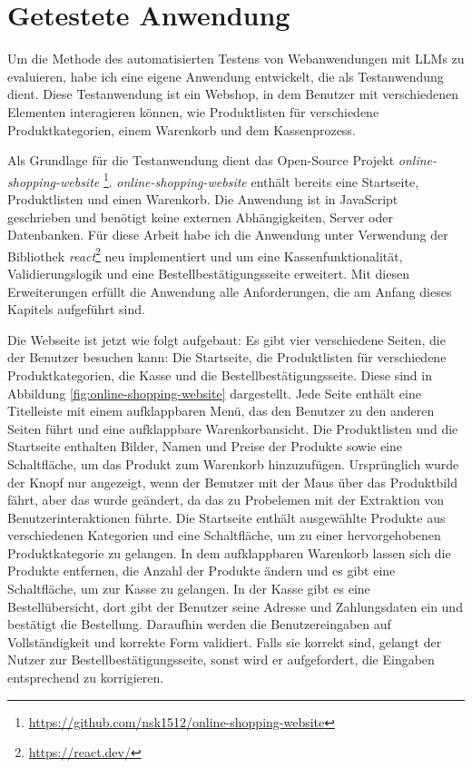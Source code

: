 \section{Getestete Anwendung}

Um die Methode des automatisierten Testens von Webanwendungen mit LLMs zu evaluieren, habe ich eine eigene Anwendung entwickelt, die als Test\-anwendung dient.
Diese Testanwendung ist ein Webshop, in dem Benutzer mit verschiedenen Elementen interagieren können, wie Produktlisten für verschiedene Produktkategorien, einem Warenkorb und dem Kassenprozess.

Als Grundlage für die Testanwendung dient das Open-Source Projekt \textit{online-shopping-website} \footnote{\url{https://github.com/nsk1512/online-shopping-website}}.
\textit{online-shopping-website} enthält bereits eine Startseite, Produktlisten und einen Warenkorb.
Die Anwendung ist in JavaScript geschrieben und benötigt keine externen Abhängigkeiten, Server oder Datenbanken.
Für diese Arbeit habe ich die Anwendung unter Verwendung der Bibliothek \textit{react}\footnote{\url{https://react.dev/}} neu implementiert und um eine Kassenfunktionalität, Validierungslogik und eine Bestellbestätigungsseite erweitert.
Mit diesen Erweiterungen erfüllt die Anwendung alle Anforderungen, die am Anfang dieses Kapitels aufgeführt sind.


Die Webseite ist jetzt wie folgt aufgebaut:
Es gibt vier verschiedene Seiten, die der Benutzer besuchen kann: Die Startseite, die Produktlisten für verschiedene Produktkategorien, die Kasse und die Bestellbestätigungsseite.
Diese sind in Abbildung \ref{fig:online-shopping-website} dargestellt.
Jede Seite enthält eine Titelleiste mit einem aufklappbaren Menü, das den Benutzer zu den anderen Seiten führt und eine aufklappbare Warenkorbansicht.
Die Produktlisten und die Startseite enthalten Bilder, Namen und Preise der Produkte sowie eine Schaltfläche, um das Produkt zum Warenkorb hinzuzufügen.
Ursprünglich wurde der Knopf nur angezeigt, wenn der Benutzer mit der Maus über das Produktbild fährt, aber das wurde geändert, da das zu Probelemen mit der Extraktion von Benutzerinteraktionen führte.
Die Startseite enthält ausgewählte Produkte aus verschiedenen Kategorien und eine Schaltfläche, um zu einer hervorgehobenen Produktkategorie zu gelangen.
In dem aufklappbaren Warenkorb lassen sich die Produkte entfernen, die Anzahl der Produkte ändern und es gibt eine Schaltfläche, um zur Kasse zu gelangen.
In der Kasse gibt es eine Bestellübersicht, dort gibt der Benutzer seine Adresse und Zahlungsdaten ein und bestätigt die Bestellung.
Daraufhin werden die Benutzereingaben auf Vollständigkeit und korrekte Form validiert.
Falls sie korrekt sind, gelangt der Nutzer zur Bestellbestätigungsseite, sonst wird er aufgefordert, die Eingaben entsprechend zu korrigieren.

